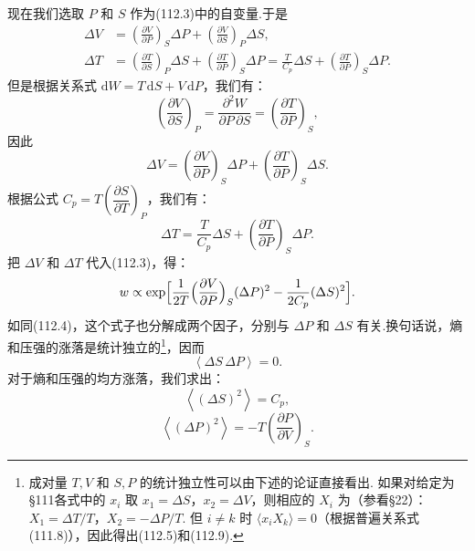 现在我们选取 $P$ 和 $S$ 作为(112.3)中的自变量.于是
\begin{equation*}
\begin{aligned}
  \Delta V&=\left(\frac{\partial V}{\partial P}\right)_{S}\Delta P
  +\left(\frac{\partial V}{\partial S}\right)_{P}\Delta S,\\
  \Delta T&=\left(\frac{\partial T}{\partial S}\right)_{P}\Delta S
  +\left(\frac{\partial T}{\partial P}\right)_{S}\Delta P
  =\frac{T}{C_{p}}\Delta S+\left(\frac{\partial T}{\partial P}\right)_{S}\Delta P.
\end{aligned}
\end{equation*}
但是根据关系式 $\mathrm{d}W=T\,\mathrm{d}S+V\,\mathrm{d}P$，我们有：
\begin{equation*}
  \left(\frac{\partial V}{\partial S}\right)_{P}
  =\frac{\partial^{2}W}{\partial P\,\partial S}
  =\left(\frac{\partial T}{\partial P}\right)_{S},
\end{equation*}
因此
\begin{equation*}
  \Delta V=\left(\frac{\partial V}{\partial P}\right)_{S}\Delta P
  +\left(\frac{\partial T}{\partial P}\right)_{S}\Delta S.
\end{equation*}
根据公式 $C_{p}=T\left(\dfrac{\partial S}{\partial T}\right)_{P}$，我们有：
\begin{equation*}
  \Delta T=\frac{T}{C_{p}}\Delta S
  +\left(\frac{\partial T}{\partial P}\right)_{S}\Delta P.
\end{equation*}
把 $\Delta V$ 和 $\Delta T$ 代入(112.3)，得：
\begin{equation}
  w\propto\exp\Bigl[\frac{1}{2T}\Bigl(\frac{\partial V}{\partial P}\Bigr)_{S}
  (\Delta P)^{2}-\frac{1}{2C_{p}}(\Delta S)^{2}\Bigr].
\end{equation}
如同(112.4)，这个式子也分解成两个因子，分别与 $\Delta P$ 和 $\Delta S$ 有关.换句话说，熵和压强的涨落是统计独立的\footnote{成对量 $T,V$ 和 $S,P$ 的统计独立性可以由下述的论证直接看出. 如果对给定为§111各式中的 $x_{i}$ 取 $x_{1}=\Delta S$，$x_{2}=\Delta V$，则相应的 $X_{i}$ 为（参看§22）：$X_{1}=\Delta T/T$，$X_{2}=-\Delta P/T$. 但 $i\neq k$ 时 $\langle x_{i}X_{k}\rangle=0$（根据普遍关系式(111.8)），因此得出(112.5)和(112.9).}，因而
\begin{equation}
  \left\langle\Delta S\,\Delta P\right\rangle=0.
\end{equation}
对于熵和压强的均方涨落，我们求出：
\begin{equation}
  \left\langle(\Delta S)^{2}\right\rangle=C_{p},
\end{equation}
\begin{equation}
  \left\langle(\Delta P)^{2}\right\rangle
  =-T\left(\frac{\partial P}{\partial V}\right)_{S}.
\end{equation}

